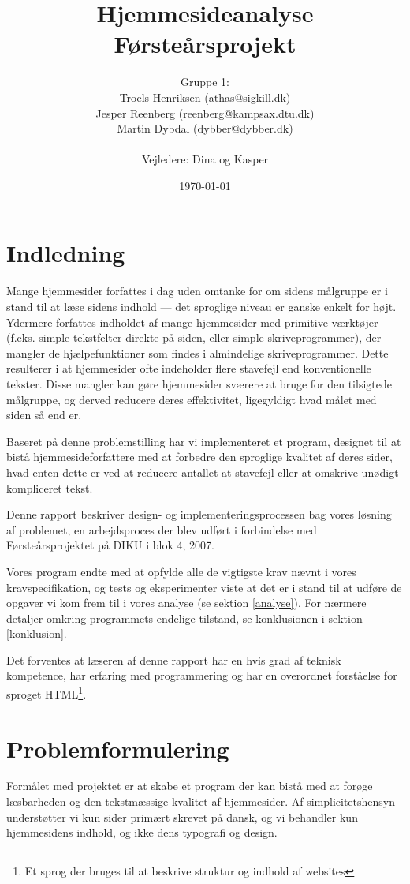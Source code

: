 \documentclass[a4paper,oneside]{memoir}
\title{Hjemmesideanalyse  \\ \small{Førsteårsprojekt}}
\author
{
  Gruppe 1:\\
  Troels Henriksen (athas@sigkill.dk)\\
  Jesper Reenberg (reenberg@kampsax.dtu.dk)\\
  Martin Dybdal (dybber@dybber.dk)\\ \\
  Vejledere: Dina og Kasper
}
\date{\today}
\begin{document}
\maketitle
\newpage
\tableofcontents*



\chapter{Indledning}
\label{indledning}
Mange hjemmesider forfattes i dag uden omtanke for om sidens målgruppe
er i stand til at læse sidens indhold --- det sproglige niveau er
ganske enkelt for højt. Ydermere forfattes indholdet af mange
hjemmesider med primitive værktøjer (f.eks. simple tekstfelter direkte
på siden, eller simple skriveprogrammer), der mangler de
hjælpefunktioner som findes i almindelige skriveprogrammer. Dette
resulterer i at hjemmesider ofte indeholder flere stavefejl end
konventionelle tekster. Disse mangler kan gøre hjemmesider sværere at
bruge for den tilsigtede målgruppe, og derved reducere deres
effektivitet, ligegyldigt hvad målet med siden så end er.

Baseret på denne problemstilling har vi implementeret et program,
designet til at bistå hjemmesideforfattere med at forbedre den
sproglige kvalitet af deres sider, hvad enten dette er ved at reducere
antallet at stavefejl eller at omskrive unødigt kompliceret tekst.

Denne rapport beskriver design- og implementeringsprocessen bag vores
løsning af problemet, en arbejdsproces der blev udført i forbindelse
med Førsteårsprojektet på DIKU i blok 4, 2007.

Vores program endte med at opfylde alle de vigtigste krav nævnt i
vores kravspecifikation, og tests og eksperimenter viste at det er i
stand til at udføre de opgaver vi kom frem til i vores analyse (se
sektion \ref{analyse}). For nærmere detaljer omkring programmets
endelige tilstand, se konklusionen i sektion \ref{konklusion}.

Det forventes at læseren af denne rapport har en hvis grad af teknisk
kompetence, har erfaring med programmering og har en overordnet
forståelse for sproget HTML\footnote{Et sprog der bruges til at
  beskrive struktur og indhold af websites}.

\chapter{Problemformulering}
\label{problemformulering}
Formålet med projektet er at skabe et program der kan bistå med at
forøge læsbarheden og den tekstmæssige kvalitet af hjemmesider. Af
simplicitetshensyn understøtter vi kun sider primært skrevet på dansk,
og vi behandler kun hjemmesidens indhold, og ikke dens typografi og
design.
\end{document}
